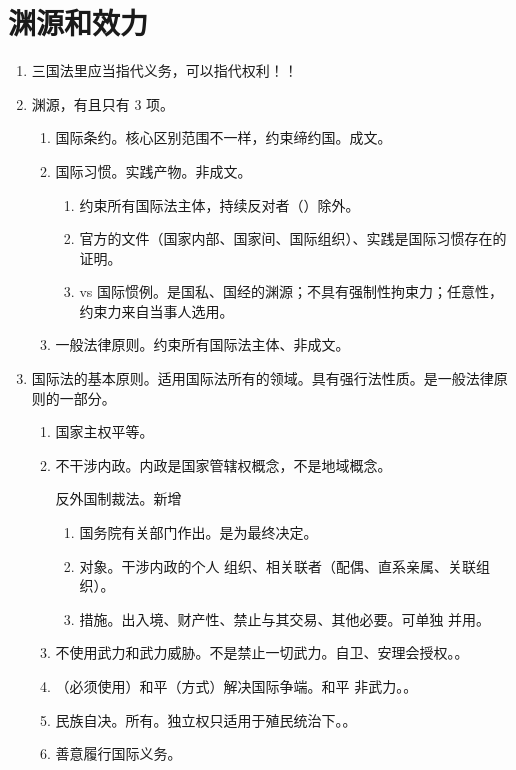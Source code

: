 \section{渊源和效力}
\begin{enumerate}
  \item 三国法里应当指代义务，可以指代权利！！
  \item 渊源，有且只有 3 项。
        \begin{enumerate}
          \item 国际条约。核心区别范围不一样，约束缔约国。成文。
          \item 国际习惯。实践产物。非成文。
                \begin{enumerate}
                  \item 约束所有国际法主体，持续反对者（）除外。
                  \item 官方的文件（国家内部、国家间、国际组织）、实践是国际习惯存在的证明。
                  \item vs 国际惯例。是国私、国经的渊源；不具有强制性拘束力；任意性，约束力来自当事人选用。
                \end{enumerate}
          \item 一般法律原则。约束所有国际法主体、非成文。
        \end{enumerate}
  \item 国际法的基本原则。适用国际法所有的领域。具有强行法性质。是一般法律原则的一部分。
        \begin{enumerate}
          \item 国家主权平等。
          \item 不干涉内政。内政是国家管辖权概念，不是地域概念。
                \begin{kk}{反外国制裁法。新增}
                  \begin{enumerate}
                    \item 国务院有关部门作出。是为最终决定。
                    \item 对象。干涉内政的个人 \hz 组织、相关联者（配偶、直系亲属、关联组织）。
                    \item 措施。出入境、财产性、禁止与其交易、其他必要。可单独 \hz 并用。
                  \end{enumerate}
                \end{kk}
          \item 不使用武力和武力威胁。不是禁止一切武力。自卫、安理会授权。。
          \item （必须使用）和平（方式）解决国际争端。和平 \bdy 非武力。。
          \item 民族自决。所有。独立权只适用于殖民统治下。。
          \item 善意履行国际义务。
        \end{enumerate}
\end{enumerate}
